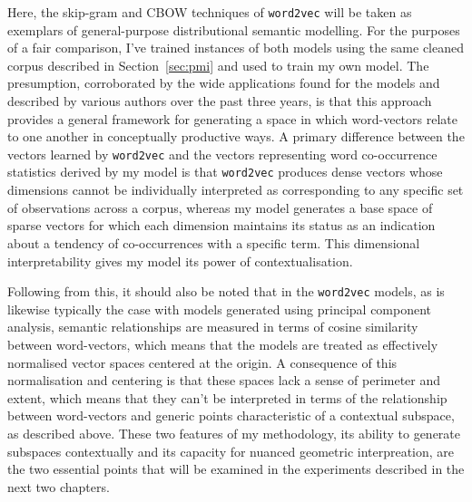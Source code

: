 Here, the skip-gram and CBOW techniques of \texttt{word2vec} will be taken as exemplars of general-purpose distributional semantic modelling.  For the purposes of a fair comparison, I've trained instances of both models using the same cleaned corpus described in Section~\ref{sec:pmi} and used to train my own model.  The presumption, corroborated by the wide applications found for the models and described by various authors over the past three years, is that this approach provides a general framework for generating a space in which word-vectors relate to one another in conceptually productive ways.  A primary difference between the vectors learned by \texttt{word2vec} and the vectors representing word co-occurrence statistics derived by my model is that \texttt{word2vec} produces dense vectors whose dimensions cannot be individually interpreted as corresponding to any specific set of observations across a corpus, whereas my model generates a base space of sparse vectors for which each dimension maintains its status as an indication about a tendency of co-occurrences with a specific term.  This dimensional interpretability gives my model its power of contextualisation.

Following from this, it should also be noted that in the \texttt{word2vec} models, as is likewise typically the case with models generated using principal component analysis, semantic relationships are measured in terms of cosine similarity between word-vectors, which means that the models are treated as effectively normalised vector spaces centered at the origin.  A consequence of this normalisation and centering is that these spaces lack a sense of perimeter and extent, which means that they can't be interpreted in terms of the relationship between word-vectors and generic points characteristic of a contextual subspace, as described above.  These two features of my methodology, its ability to generate subspaces contextually and its capacity for nuanced geometric interpreation, are the two essential points that will be examined in the experiments described in the next two chapters.

